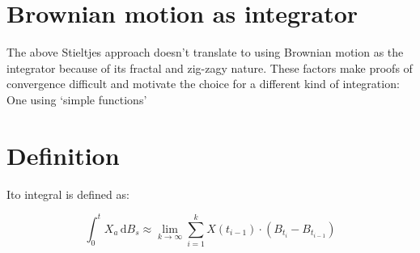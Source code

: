 \documentclass[12pt]{article}
\begin{document}
\section{Brownian motion as integrator}

The above Stieltjes approach doesn't translate to using Brownian motion as the integrator because of its fractal and zig-zagy nature. These factors make proofs of convergence difficult and motivate the choice for a different kind of integration: One using `simple functions'

\section{Definition}

Ito integral is defined as:

\begin{equation} \label{eq:itoIntegral}
	\int_{0}^{t}X_a\,\mathrm{d}B_s\approx\lim\limits_{k\to\infty}\sum_{i=1}^{k}X(t_{i-1})\cdot(B_{t_i}-B_{t_{i-1}})
\end{equation}
\end{document}
